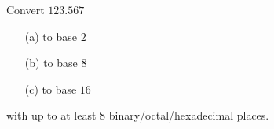 Convert $123.567$
\begin{enumerate}
\item[(a)] to base $2$
\item[(b)] to base $8$
\item[(c)] to base $16$
\end{enumerate}
with up to at least 8 binary/octal/hexadecimal places.
